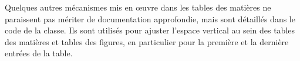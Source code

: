 
\begin{developer}
Quelques autres mécanismes mis en œuvre dans les tables des matières ne paraissent pas mériter de documentation approfondie, mais sont détaillés dans le code de la classe. Ils sont utilisés pour ajuster l'espace vertical au sein des tables des matières et tables des figures, en particulier pour la première et la dernière entrées de la table.
\end{developer}


\begin{noprint}
\end{noprint}

\begin{noprint}
\end{noprint}



